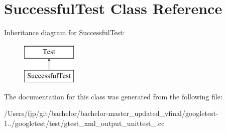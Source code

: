 \hypertarget{class_successful_test}{}\section{Successful\+Test Class Reference}
\label{class_successful_test}
Inheritance diagram for Successful\+Test\+:\begin{figure}[H]
\begin{center}
\leavevmode
\includegraphics[height=2.000000cm]{class_successful_test}
\end{center}
\end{figure}


The documentation for this class was generated from the following file\+:\begin{DoxyCompactItemize}
\item 
/\+Users/fjp/git/bachelor/bachelor-\/master\+\_\+updated\+\_\+vfinal/googletest-\/1../googletest/test/gtest\+\_\+xml\+\_\+output\+\_\+unittest\+\_\+.\+cc\end{DoxyCompactItemize}

